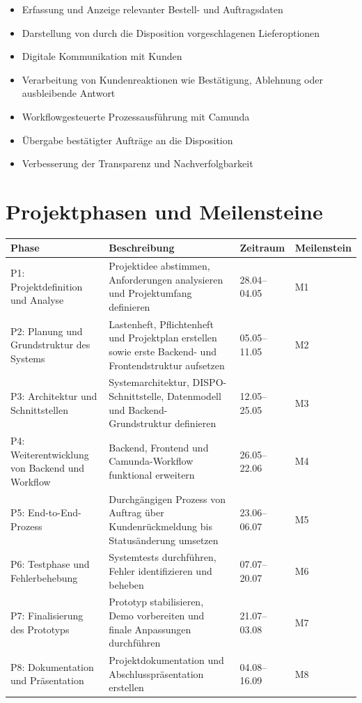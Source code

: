 \documentclass[12pt,a4paper]{article}
\begin{document}
\begin{itemize}
    \item Erfassung und Anzeige relevanter Bestell- und Auftragsdaten
    \item Darstellung von durch die Disposition vorgeschlagenen Lieferoptionen
    \item Digitale Kommunikation mit Kunden
    \item Verarbeitung von Kundenreaktionen wie Bestätigung, Ablehnung oder ausbleibende Antwort
    \item Workflowgesteuerte Prozessausführung mit Camunda
    \item Übergabe bestätigter Aufträge an die Disposition
    \item Verbesserung der Transparenz und Nachverfolgbarkeit
\end{itemize}

\section{Projektphasen und Meilensteine}

\begin{longtable}{p{4.5cm} p{6cm} p{3cm} p{2cm}}
\toprule
\textbf{Phase} & \textbf{Beschreibung} & \textbf{Zeitraum} & \textbf{Meilenstein} \\
\midrule

P1: Projektdefinition und Analyse 
& Projektidee abstimmen, Anforderungen analysieren und Projektumfang definieren 
& 28.04--04.05 
& M1 \\

P2: Planung und Grundstruktur des Systems 
& Lastenheft, Pflichtenheft und Projektplan erstellen sowie erste Backend- und Frontendstruktur aufsetzen 
& 05.05--11.05 
& M2 \\

P3: Architektur und Schnittstellen 
& Systemarchitektur, DISPO-Schnittstelle, Datenmodell und Backend-Grundstruktur definieren 
& 12.05--25.05 
& M3 \\

P4: Weiterentwicklung von Backend und Workflow 
& Backend, Frontend und Camunda-Workflow funktional erweitern 
& 26.05--22.06 
& M4 \\

P5: End-to-End-Prozess 
& Durchgängigen Prozess von Auftrag über Kundenrückmeldung bis Statusänderung umsetzen 
& 23.06--06.07 
& M5 \\

P6: Testphase und Fehlerbehebung 
& Systemtests durchführen, Fehler identifizieren und beheben 
& 07.07--20.07 
& M6 \\

P7: Finalisierung des Prototyps 
& Prototyp stabilisieren, Demo vorbereiten und finale Anpassungen durchführen 
& 21.07--03.08 
& M7 \\

P8: Dokumentation und Präsentation 
& Projektdokumentation und Abschlusspräsentation erstellen 
& 04.08--16.09 
& M8 \\

\bottomrule
\end{longtable}
\end{document}
